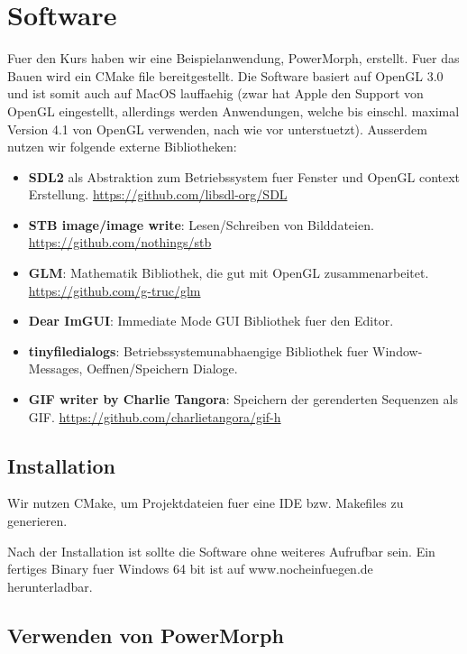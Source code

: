 \chapter{Software}

Fuer den Kurs haben wir eine Beispielanwendung, PowerMorph, erstellt.
Fuer das Bauen wird ein CMake file bereitgestellt. Die Software basiert
auf OpenGL 3.0 und ist somit auch auf MacOS lauffaehig (zwar hat Apple
den Support von OpenGL eingestellt, allerdings werden Anwendungen, welche bis
einschl. maximal Version 4.1 von OpenGL verwenden, nach wie vor unterstuetzt).
Ausserdem nutzen wir folgende externe Bibliotheken:

\begin{itemize}
	\item \textbf{SDL2} als Abstraktion zum Betriebssystem fuer Fenster und OpenGL context Erstellung.
	\href{https://github.com/libsdl-org/SDL}{https://github.com/libsdl-org/SDL} 
	\item \textbf{STB image/image write}: Lesen/Schreiben von Bilddateien.
		\href{https://github.com/nothings/stb}{https://github.com/nothings/stb} 
	\item \textbf{GLM}: Mathematik Bibliothek, die gut mit OpenGL zusammenarbeitet. 
			\href{https://github.com/g-truc/glm}{https://github.com/g-truc/glm}
	\item \textbf{Dear ImGUI}: Immediate Mode GUI Bibliothek fuer den Editor.
	\item \textbf{tinyfiledialogs}: Betriebssystemunabhaengige Bibliothek fuer Window-Messages, Oeffnen/Speichern Dialoge.
	\item \textbf{GIF writer by Charlie Tangora}: Speichern der gerenderten Sequenzen als GIF.
				\href{https://github.com/charlietangora/gif-h}{https://github.com/charlietangora/gif-h} 
\end{itemize}

\section{Installation}

Wir nutzen CMake, um Projektdateien
fuer eine IDE bzw. Makefiles zu generieren. 

Nach der Installation ist sollte die Software ohne weiteres Aufrufbar sein. Ein fertiges Binary fuer Windows 64 bit ist auf 
www.nocheinfuegen.de herunterladbar.

\section{Verwenden von PowerMorph}


